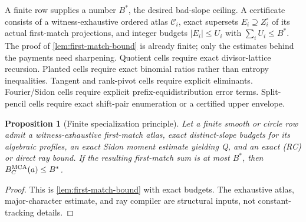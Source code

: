 \documentclass[12pt,a4paper]{amsart}
\numberwithin{equation}{section}
\newtheorem{proposition}[proposition]{Proposition}
\theoremstyle{remark}
\newcommand{\Ccal}{\mathcal C}
\newcommand{\abs}[1]{\lvert #1\rvert}
\begin{document}
A finite row supplies a number \(B^*\), the desired bad-slope ceiling.  A
certificate consists of a witness-exhaustive ordered atlas
\(\Ccal_i\), exact supersets \(E_i\supseteq Z_i^\circ\) of its actual
first-match projections, and integer budgets \(\abs{E_i}\le U_i\) with
\(\sum_iU_i\le B^*\).  The proof of \cref{lem:first-match-bound} is already
finite; only the estimates behind the payments need sharpening.  Quotient
cells require exact divisor-lattice recursion.  Planted cells require exact
binomial ratios rather than entropy inequalities.  Tangent and rank-pivot
cells require explicit eliminants.  Fourier/Sidon cells require explicit
prefix-equidistribution error terms.  Split-pencil cells require exact
shift-pair enumeration or a certified upper envelope.

\begin{proposition}[Finite specialization principle]\label{prop:finite-specialization-principle}
Let a finite smooth or circle row admit a witness-exhaustive first-match atlas,
exact distinct-slope budgets for its algebraic profiles, an exact Sidon
moment estimate yielding Q, and an exact \textup{(RC)} or direct ray bound.
If the resulting first-match sum is at most \(B^*\), then
\(B_C^{\rm MCA}(a)\le B^*\).
\end{proposition}

\begin{proof}
This is \cref{lem:first-match-bound} with exact budgets.  The exhaustive
atlas, major-character estimate, and ray compiler are structural inputs,
not constant-tracking details.
\end{proof}
\end{document}
